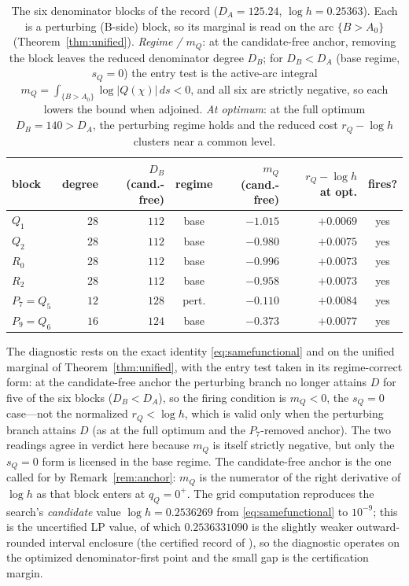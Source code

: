 \documentclass[11pt,reqno]{amsart}
\theoremstyle{plain}
\theoremstyle{definition}
\theoremstyle{remark}
\newcommand{\rQ}{r_Q}
\newcommand{\dA}{D_A}
\newcommand{\dB}{D_B}
\begin{document}
\begin{table}[ht]
\centering\small
\renewcommand{\arraystretch}{1.2}
\begin{tabular}{@{}lrrcrrc@{}}
\toprule
block & degree & $\dB$ (cand.-free) & regime & $m_Q$ (cand.-free) & $\rQ-\log h$ at opt. & fires?\\
\midrule
$Q_1$ & $28$ & $112$ & base & $-1.015$ & $+0.0069$ & yes\\
$Q_2$ & $28$ & $112$ & base & $-0.980$ & $+0.0075$ & yes\\
$R_0$ & $28$ & $112$ & base & $-0.996$ & $+0.0073$ & yes\\
$R_2$ & $28$ & $112$ & base & $-0.958$ & $+0.0073$ & yes\\
$P_7=Q_5$ & $12$ & $128$ & pert. & $-0.110$ & $+0.0084$ & yes\\
$P_9=Q_6$ & $16$ & $124$ & base & $-0.373$ & $+0.0077$ & yes\\
\bottomrule
\end{tabular}
\medskip
\caption{The six denominator blocks of the \citet{Gri26} record ($\dA=125.24$,
$\log h=0.25363$). Each is a perturbing (B-side) block, so its marginal is read on the
arc $\{B>A_0\}$ (Theorem~\ref{thm:unified}). \emph{Regime / $m_Q$}: at the candidate-free
anchor, removing the block leaves the reduced denominator degree $\dB$; for $\dB<\dA$
(base regime, $s_Q=0$) the entry test is the active-arc integral
$m_Q=\int_{\{B>A_0\}}\log|Q(\chi)|\,ds<0$, and all six are strictly negative, so each
lowers the bound when adjoined. \emph{At optimum}: at the full optimum $\dB=140>\dA$, the
perturbing regime holds and the reduced cost $\rQ-\log h$ clusters near a common level.}
\label{tab:recordfire}
\end{table}

The diagnostic rests on the exact identity \eqref{eq:samefunctional} and on the unified
marginal of Theorem~\ref{thm:unified}, with the entry test taken in its regime-correct
form: at the candidate-free anchor the perturbing branch no longer attains $D$ for five
of the six blocks ($\dB<\dA$), so the firing condition is $m_Q<0$, the $s_Q=0$ case---not
the normalized $\rQ<\log h$, which is valid only when the perturbing branch attains $D$
(as at the full optimum and the $P_7$-removed anchor). The two readings agree in verdict
here because $m_Q$ is itself strictly negative, but only the $s_Q=0$ form is licensed in
the base regime. The candidate-free anchor is the one called for by
Remark~\ref{rem:anchor}: $m_Q$ is the numerator of the right derivative of $\log h$ as
that block enters at $q_Q=0^+$. The grid computation reproduces the search's
\emph{candidate} value $\log h=0.2536269$ from \eqref{eq:samefunctional} to $10^{-9}$;
this is the uncertified LP value, of which $0.2536331090$ is the slightly weaker
outward-rounded interval enclosure (the certified record of \citet{Gri26}), so the
diagnostic operates on the optimized denominator-first point and the small gap is the
certification margin.
\end{document}

